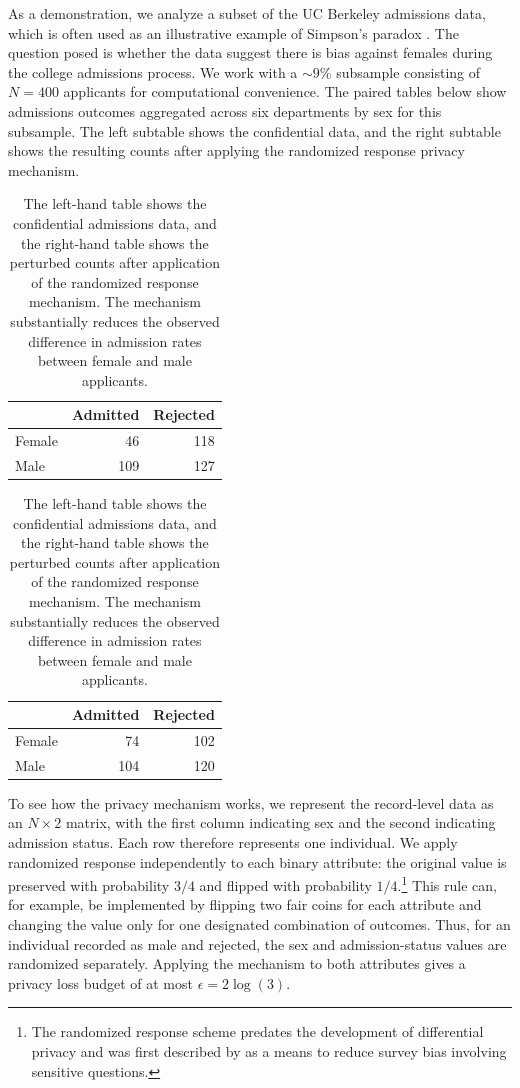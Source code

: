 As a demonstration, we analyze a subset of the UC Berkeley admissions data, which is often
used as an illustrative example of Simpson's paradox \citep{Bickel1975}. The question posed is whether
the data suggest there is bias against females during the college admissions
process. We work with a \(\sim 9\%\) subsample consisting of \(N = 400\) applicants for
computational convenience. The paired tables below show admissions outcomes aggregated across six departments by sex
for this subsample. The left subtable shows the confidential data, and the right subtable shows the resulting counts after applying the randomized response privacy mechanism.

\begin{table}
\centering\caption{\label{tab:admissions-rr}The left-hand table shows the confidential admissions data, and the right-hand table shows the perturbed counts after application of the randomized response mechanism. The mechanism substantially reduces the observed difference in admission rates between female and male applicants.}

\centering
\begin{tabular}[t]{lrr}
\toprule
  & Admitted & Rejected\\
\midrule
Female & 46 & 118\\
Male & 109 & 127\\
\bottomrule
\end{tabular}
\centering
\begin{tabular}[t]{lrr}
\toprule
  & Admitted & Rejected\\
\midrule
Female & 74 & 102\\
Male & 104 & 120\\
\bottomrule
\end{tabular}
\end{table}

To see how the privacy mechanism works, we represent the record-level data as an
\(N \times 2\) matrix, with the first column indicating sex and the second
indicating admission status. Each row therefore represents one individual. We
apply randomized response independently to each binary attribute: the original
value is preserved with probability \(3/4\) and flipped with probability \(1/4\).\footnote{The randomized response scheme predates the development of differential privacy and was first described by \citet{Warner1965} as a means to reduce survey bias involving sensitive questions.}
This rule can, for example, be implemented by flipping two fair coins for each
attribute and changing the value only for one designated combination of
outcomes. Thus, for an individual recorded as male and rejected, the sex and
admission-status values are randomized separately. Applying the mechanism to
both attributes gives a privacy loss budget of at most \(\epsilon = 2\log(3)\).

